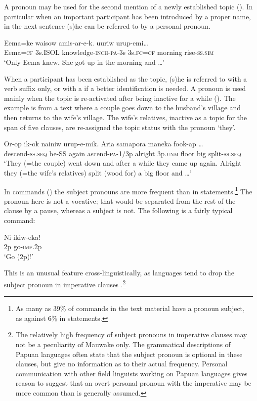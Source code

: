 A pronoun may be used for the second mention of a newly established topic (). In particular when an important participant has been introduced by a proper name, in the next sentence (s)he can be referred to by a personal pronoun. 

\ea%
\label{ex:3:x1867}
\gll Eema=ke waisow amis-ar-e-k.  uuriw urup-emi{\dots}\\
Eema=\textsc{cf} 3s.ISOL knowledge-\textsc{inch}-\textsc{pa}-3s 3s.\textsc{fc}=\textsc{cf} morning rise-\textsc{ss}.\textsc{sim}\\
\glt`Only Eema knew. She got up in the morning and {\dots}'
\z

When a participant has been established as the topic, (s)he is referred to with a verb suffix only, or with a  if a better identification is needed. A pronoun is used mainly when the topic is re-activated after being inactive for a while (). The example  is from a text where a couple goes down to the husband's village and then returns to the wife's village. The wife's relatives, inactive as a topic for the span of five clauses, are re-assigned the topic status with the pronoun  `they'. 

\ea%
\label{ex:3:x1922}
\gll Or-op ik-ok nainiw urup-e-mik. Aria  samapora maneka fook-ap {\dots}\\
descend-\textsc{ss}.\textsc{seq} be-SS again ascend-\textsc{pa}-1/3p alright 3p.\textsc{unm} floor big split-\textsc{ss}.\textsc{seq} \\
\glt`They (=the couple) went down and after a while they came up again. Alright they (=the wife's relatives) split (wood for) a big floor and {\dots}'
\z

In commands () the subject pronouns are more frequent than in statements.\footnote{As many as 39\% of commands in the text material have a pronoun subject, as against 6\% in statements.} The pronoun here is not a vocative; that would be separated from the rest of the clause by a pause, whereas a subject is not. The following is a fairly typical command:

\ea%
\label{ex:3:x685}
\gll Ni ikiw-eka! \\
2p go-\textsc{imp}.2p\\
\glt`Go (2p)!'
\z

This is an unusual feature cross-linguistically, as languages tend to drop the subject pronoun in imperative clauses \citep[80]{Givon1979}.\footnote{The relatively high frequency of subject pronouns in imperative clauses may not be a peculiarity of Mauwake only. The grammatical descriptions of Papuan languages often state that the subject pronoun is optional in these clauses, but give no information as to their actual frequency. Personal communication with other field linguists working on Papuan languages gives reason to suggest that an overt personal pronoun with the imperative may be more common than is generally assumed.} 


